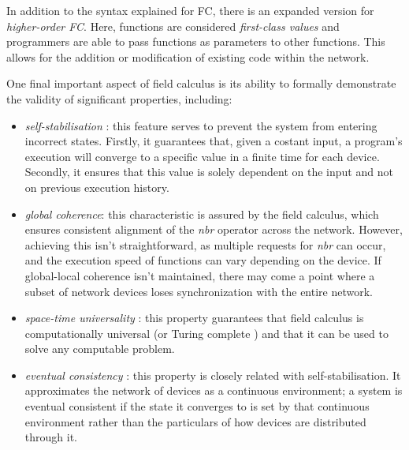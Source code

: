 \documentclass[12pt,a4paper,openright,twoside]{book}
\begin{document}
In addition to the syntax explained for FC, there is an expanded version for \emph{higher-order FC}. 
    Here, functions are considered \emph{first-class values} and programmers are able to pass functions as parameters 
    to other functions. This allows for the addition or modification of existing code within the network.

One final important aspect of field calculus is its ability to formally demonstrate the 
    validity of significant properties, including:
    \begin{itemize}
        \item \emph{self-stabilisation} \cite{viroli2018engineering, viroli2014calculus, dolev2000self,lafuente2015fixpoint}:
        this feature serves to prevent the system from entering incorrect states. Firstly, it guarantees that, given a costant input, a program's 
        execution will converge to a specific value in a finite time for each device. Secondly, it ensures that this value is solely 
        dependent on the input and not on previous execution history.
        \item \emph{global coherence}: this characteristic is assured by the field calculus, which ensures consistent alignment of the \emph{nbr}
        operator across the network. However, achieving this isn't straightforward, as multiple requests for \emph{nbr} can occur, 
        and the execution speed of functions can vary depending on the device. 
        If global-local coherence isn't maintained, there may come a point where a subset of network devices loses 
        synchronization with the entire network.
        \item \emph{space-time universality} \cite{audrito2018space}: this property guarantees that field calculus is computationally 
        universal (or Turing complete \cite{turing2009computing, turing1936computable}) and that it can be used to solve any computable problem.
        \item \emph{eventual consistency} \cite{beal2017self}: this property is closely related with self-stabilisation. It approximates the network of devices
        as a continuous environment; a system is eventual consistent if the state it converges to is set by that continuous environment rather than 
        the particulars of how devices are distributed through it.
    \end{itemize}
    
\end{document}
